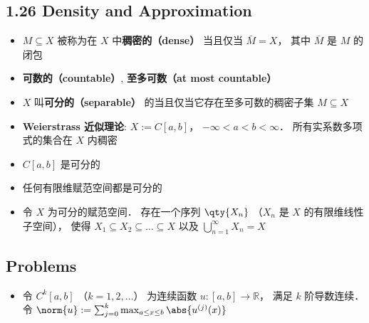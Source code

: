 \subsection{1.26 Density and Approximation}
\begin{itemize}
\item $M \subseteq X$ 被称为在 $X$ 中\textbf{稠密的（dense）} 当且仅当 $\bar M = X$， 其中 $\bar M$ 是 $M$ 的闭包

\item \textbf{可数的（countable）}, \textbf{至多可数（at most countable）}

\item $X$ 叫\textbf{可分的（separable）} 的当且仅当它存在至多可数的稠密子集 $M \subseteq X$

\item \textbf{Weierstrass 近似理论}: $X := C[a, b]$， $-\infty < a < b < \infty$． 所有实系数多项式的集合在 $X$ 内稠密

\item $C[a, b]$ 是可分的

\item 任何有限维赋范空间都是可分的

\item 令 $X$ 为可分的赋范空间． 存在一个序列 $\qty{X_n}$ （$X_n$ 是 $X$ 的有限维线性子空间）， 使得 $X_1 \subseteq X_2 \subseteq \dots \subseteq X$ 以及 $\bigcup_{n=1}^\infty X_n = X$

\end{itemize}

\subsection{Problems}
\begin{itemize}
\item 令 $C^k[a, b]$ （$k=1,2,\dots$） 为连续函数 $u:[a, b]\to\mathbb R$， 满足 $k$ 阶导数连续． 令 $\norm{u} := \sum_{j=0}^k \max_{a\le x\le b} \abs{u^{(j)}(x)}$
\end{itemize}
